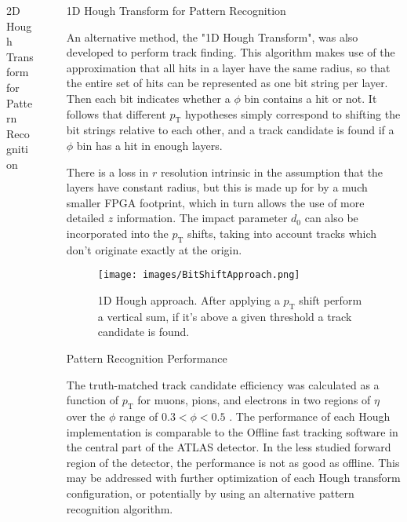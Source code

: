 \documentclass[final]{beamer}
\newlength{\sepwidth}
\newlength{\colwidth}
\newcommand{\separatorcolumn}{\begin{column}{\sepwidth}\end{column}}
\begin{document}
\begin{frame}[t]
\begin{columns}[t]
\begin{column}{\colwidth}
\begin{block}{2D Hough Transform for Pattern Recognition}
  \end{block}

\end{column}

\separatorcolumn

\begin{column}{\colwidth}


  \begin{block}{1D Hough Transform for Pattern Recognition}

  An alternative method, the "1D Hough Transform", was also developed to perform track finding. This algorithm makes use of the approximation that all hits in a layer 
  have the same radius, so that the entire set of hits can be represented as one bit string per layer. Then each bit indicates whether a $\phi$ bin contains a hit or not.
  It follows that different $p_\text{T}$ hypotheses simply correspond to shifting the bit strings relative to each other, and a track candidate is found if a $\phi$ bin has a hit in enough
  layers. 
  
  There is a loss in $r$ resolution intrinsic in the assumption that the layers have constant radius, but this is made up for by a much smaller FPGA footprint, which in turn allows
  the use of more detailed $z$ information. The impact parameter $d_0$ can also be incorporated into the $p_\text{T}$ shifts, taking into account tracks 
  which don't originate exactly at the origin.

  \begin{figure}
    \centering
    \texttt{[image: images/BitShiftApproach.png]}
    \caption*{1D Hough approach. After applying a $p_\text{T}$ shift perform a vertical sum, if it's above a given threshold a track candidate is found.}
  \end{figure}

  \end{block}

  

   

  \begin{block}{Pattern Recognition Performance}

    The truth-matched track candidate efficiency was calculated as a function of $p_\text{T}$ for muons, pions, and electrons in two regions of $\eta$ over 
    the $\phi$ range of $ 0.3 < \phi < 0.5$ \cite{TDR_Amend}. The performance of each Hough implementation is comparable to the Offline fast tracking software in the central part 
    of the ATLAS detector. In the less studied forward region of the detector, the performance is not as good as offline. This may be addressed with further optimization
    of each Hough transform configuration, or potentially by using an alternative pattern recognition algorithm.


\end{block}
\end{column}
\end{columns}
\end{frame}
\end{document}
